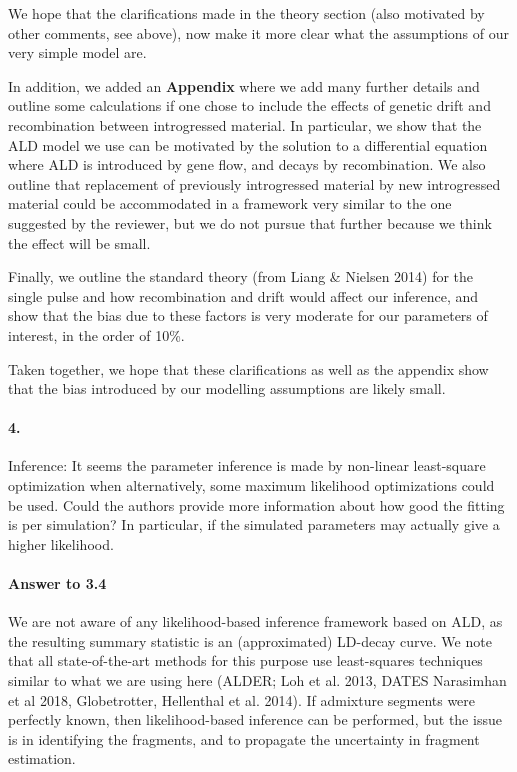 \documentclass[11pt]{article}
\let\oldparagraph\paragraph
\renewcommand{\paragraph}[1]{\oldparagraph{#1}\mbox{}}
\begin{document}
We hope that the clarifications made in the theory section (also motivated by other comments, see above), now make it more clear what the assumptions of our very simple model are.

In addition, we added an \textbf{Appendix} where we add many further details and outline some calculations if one chose to include the effects of genetic drift and recombination between introgressed material. In particular, we show that the ALD model we use can be motivated by the solution to a differential equation where ALD is introduced by gene flow, and decays by recombination. We also outline that replacement of previously introgressed material by new introgressed material could be accommodated in a framework very similar to the one suggested by the reviewer, but we do not pursue that further because we think the effect will be small.

Finally, we outline the standard theory (from Liang \& Nielsen 2014) for the single pulse and how recombination and drift would affect our inference, and show that the bias due to these factors is very moderate for our parameters of interest, in the order of 10\%.

Taken together, we hope that these clarifications as well as the appendix show that the bias introduced by our modelling assumptions are likely small.

\paragraph{4.}
Inference: It seems the parameter inference is made by non-linear least-square optimization when alternatively, some maximum likelihood optimizations could be used. Could the authors provide more information about how good the fitting is per simulation? In particular, if the simulated parameters may actually give a higher likelihood.

\paragraph{Answer to 3.4}
We are not aware of any likelihood-based inference framework based on ALD, as the resulting summary statistic is an (approximated) LD-decay curve. We note that all state-of-the-art methods for this purpose use least-squares techniques similar to what we are using here (ALDER; Loh et al. 2013, DATES Narasimhan et al 2018, Globetrotter, Hellenthal et al. 2014). If admixture segments were perfectly known, then likelihood-based inference can be performed, but the issue is in identifying the fragments, and to propagate the uncertainty in fragment estimation.
\end{document}
